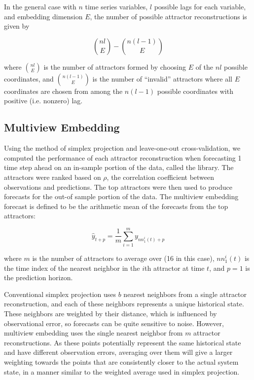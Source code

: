 In the general case with $n$ time series variables, $l$ possible lags for each variable, and embedding dimension $E$, the number of possible attractor reconstructions is given by

\begin{equation*}
{n l \choose E} - {n (l-1) \choose E}
\end{equation*}

where ${n l \choose E}$ is the number of attractors formed by choosing $E$ of the $nl$ possible coordinates, and ${n (l-1) \choose E}$ is the number of ``invalid'' attractors where all $E$ coordinates are chosen from among the $n(l-1)$ possible coordinates with positive (i.e. nonzero) lag.

\subsection{Multiview Embedding}

Using the method of simplex projection \cite{Sugihara_1990} and leave-one-out cross-validation, we computed the performance of each attractor reconstruction when forecasting 1 time step ahead on an in-sample portion of the data, called the library. The attractors were ranked based on $\rho$, the correlation coefficient between observations and predictions. The top attractors were then used to produce forecasts for the out-of sample portion of the data. The multiview embedding forecast is defined to be the arithmetic mean of the forecasts from the top attractors:

\begin{equation*}
\hat{y}_{t+p} = \frac{1}{m} \sum_{i = 1}^{m}{y_{nn_1^i(t)+p}}
\end{equation*}

where $m$ is the number of attractors to average over (16 in this case), $nn_1^{i}(t)$ is the time index of the nearest neighbor in the $i$th attractor at time $t$, and $p = 1$ is the prediction horizon.

Conventional simplex projection \cite{Sugihara_1990} uses $b$ nearest neighbors from a single attractor reconstruction, and each of these neighbors represents a unique historical state. These neighbors are weighted by their distance, which is influenced by observational error, so forecasts can be quite sensitive to noise. However, multiview embedding uses the single nearest neighbor from $m$ attractor reconstructions. As these points potentially represent the same historical state and have different observation errors, averaging over them will give a larger weighting towards the points that are consistently closer to the actual system state, in a manner similar to the weighted average used in simplex projection.


